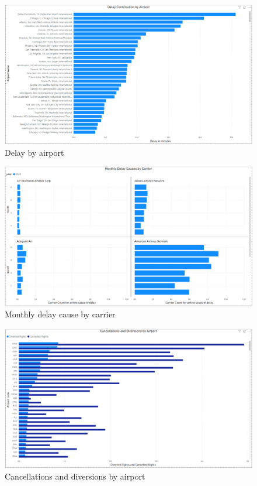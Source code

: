 \documentclass[12pt,a4paper]{article}
\begin{document}
\begin{figure}[H]
    \begin{center}
        \includegraphics[width=\textwidth]{Images/chart4.png}
        \newline
        \caption{Delay by airport}
    \end{center}
\end{figure}
\begin{figure}[H]
    \begin{center}
        \includegraphics[width=\textwidth]{Images/chart5.png}
        \newline
        \caption{Monthly delay cause by carrier}
    \end{center}
\end{figure}
\begin{figure}[H]
    \begin{center}
        \includegraphics[width=\textwidth]{Images/chart6.png}
        \newline
        \caption{Cancellations and diversions by airport}
    \end{center}
\end{figure}
\end{document}
